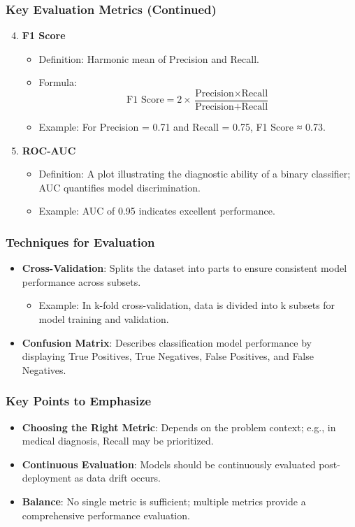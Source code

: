 \documentclass[aspectratio=169]{beamer}
\begin{document}
\begin{frame}
  \frametitle{Key Evaluation Metrics (Continued)}
  \begin{enumerate}
    \setcounter{enumi}{3}
    \item \textbf{F1 Score}
      \begin{itemize}
        \item Definition: Harmonic mean of Precision and Recall.
        \item Formula:
          \begin{equation}
            \text{F1 Score} = 2 \times \frac{\text{Precision} \times \text{Recall}}{\text{Precision} + \text{Recall}}
          \end{equation}
        \item Example: For Precision = 0.71 and Recall = 0.75, F1 Score ≈ 0.73.
      \end{itemize}

    \item \textbf{ROC-AUC}
      \begin{itemize}
        \item Definition: A plot illustrating the diagnostic ability of a binary classifier; AUC quantifies model discrimination.
        \item Example: AUC of 0.95 indicates excellent performance.
      \end{itemize}
  \end{enumerate}
\end{frame}

\begin{frame}
  \frametitle{Techniques for Evaluation}
  \begin{itemize}
    \item \textbf{Cross-Validation}: Splits the dataset into parts to ensure consistent model performance across subsets.
      \begin{itemize}
        \item Example: In k-fold cross-validation, data is divided into k subsets for model training and validation.
      \end{itemize}
      
    \item \textbf{Confusion Matrix}: Describes classification model performance by displaying True Positives, True Negatives, False Positives, and False Negatives.
  \end{itemize}
\end{frame}

\begin{frame}
  \frametitle{Key Points to Emphasize}
  \begin{itemize}
    \item \textbf{Choosing the Right Metric}: Depends on the problem context; e.g., in medical diagnosis, Recall may be prioritized.
    \item \textbf{Continuous Evaluation}: Models should be continuously evaluated post-deployment as data drift occurs.
    \item \textbf{Balance}: No single metric is sufficient; multiple metrics provide a comprehensive performance evaluation.
  \end{itemize}
\end{frame}
\end{document}
